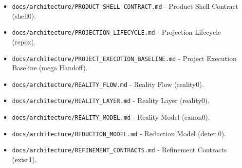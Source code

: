 \documentclass[9pt,a4paper,openany]{book}
\begin{document}
\begin{itemize}
\item \texttt{docs/\allowbreak{}architecture/\allowbreak{}PRODUCT\_\allowbreak{}SHELL\_\allowbreak{}CONTRACT.\allowbreak{}md} -\allowbreak{} Product Shell Contract (shell0).\allowbreak{}
\end{itemize}

\begin{itemize}
\item \texttt{docs/\allowbreak{}architecture/\allowbreak{}PROJECTION\_\allowbreak{}LIFECYCLE.\allowbreak{}md} -\allowbreak{} Projection Lifecycle (repox).\allowbreak{}
\end{itemize}

\begin{itemize}
\item \texttt{docs/\allowbreak{}architecture/\allowbreak{}PROJECT\_\allowbreak{}EXECUTION\_\allowbreak{}BASELINE.\allowbreak{}md} -\allowbreak{} Project Execution Baseline (mega Handoff).\allowbreak{}
\end{itemize}

\begin{itemize}
\item \texttt{docs/\allowbreak{}architecture/\allowbreak{}REALITY\_\allowbreak{}FLOW.\allowbreak{}md} -\allowbreak{} Reality Flow (reality0).\allowbreak{}
\end{itemize}

\begin{itemize}
\item \texttt{docs/\allowbreak{}architecture/\allowbreak{}REALITY\_\allowbreak{}LAYER.\allowbreak{}md} -\allowbreak{} Reality Layer (reality0).\allowbreak{}
\end{itemize}

\begin{itemize}
\item \texttt{docs/\allowbreak{}architecture/\allowbreak{}REALITY\_\allowbreak{}MODEL.\allowbreak{}md} -\allowbreak{} Reality Model (canon0).\allowbreak{}
\end{itemize}

\begin{itemize}
\item \texttt{docs/\allowbreak{}architecture/\allowbreak{}REDUCTION\_\allowbreak{}MODEL.\allowbreak{}md} -\allowbreak{} Reduction Model (deter 0).\allowbreak{}
\end{itemize}

\begin{itemize}
\item \texttt{docs/\allowbreak{}architecture/\allowbreak{}REFINEMENT\_\allowbreak{}CONTRACTS.\allowbreak{}md} -\allowbreak{} Refinement Contracts (exist1).\allowbreak{}
\end{itemize}
\end{document}
